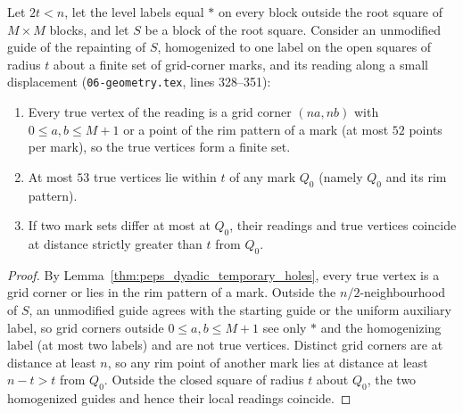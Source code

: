 \begin{lemma}
    \label{lem:peps_treated_true_vertices}
    \leanok
    Let $2t<n$, let the level labels equal $\ast$ on every block
    outside the root square of $M\times M$ blocks, and let $S$ be a block of
    the root square. Consider an unmodified guide of the repainting of $S$,
    homogenized to one label on the open squares of radius $t$ about a finite set of grid-corner marks, and its reading along a small displacement
    (\texttt{06-geometry.tex}, lines 328--351):
    \begin{enumerate}
        \item Every true vertex of the reading is a grid corner $(na,nb)$ with
              $0\le a,b\le M+1$ or a point of the rim pattern of a mark (at most $52$ points per mark), so the true vertices form a finite set.
        \item At most $53$ true vertices lie within $t$ of any mark $Q_0$ (namely $Q_0$ and its rim pattern).
        \item If two mark sets differ at most at $Q_0$, their readings
              and true vertices coincide at distance strictly greater than $t$ from $Q_0$.
    \end{enumerate}
\end{lemma}

\begin{proof}\leanok
    By Lemma~\ref{thm:peps_dyadic_temporary_holes}, every true vertex is a grid
    corner or lies in the rim pattern of a mark. Outside the $n/2$-neighbourhood of $S$, an unmodified guide agrees with
    the starting guide or the uniform auxiliary label, so grid corners outside $0\le a,b\le M+1$ see only $\ast$ and the homogenizing label (at most two labels) and are not true vertices. Distinct grid
    corners are at distance at least $n$, so any rim point of another mark lies at
    distance at least $n-t>t$ from $Q_0$. Outside the closed square of
    radius $t$ about $Q_0$, the two homogenized guides and hence their local readings coincide.
\end{proof}

